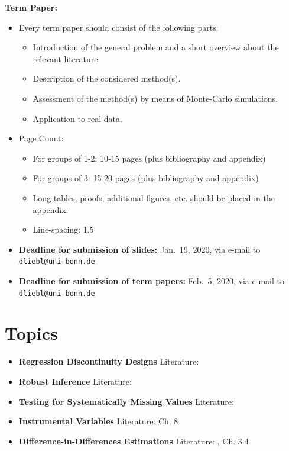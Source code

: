 \documentclass[]{book}
\providecommand{\tightlist}{%
  \setlength{\itemsep}{0pt}\setlength{\parskip}{0pt}}
\theoremstyle{definition}
\theoremstyle{definition}
\theoremstyle{definition}
\theoremstyle{remark}
\begin{document}
\textbf{Term Paper:}

\begin{itemize}
\tightlist
\item
  Every term paper should consist of the following parts:

  \begin{itemize}
  \tightlist
  \item
    Introduction of the general problem and a short overview about the relevant literature.
  \item
    Description of the considered method(s).
  \item
    Assessment of the method(s) by means of Monte-Carlo simulations.
  \item
    Application to real data.
  \end{itemize}
\item
  Page Count:

  \begin{itemize}
  \tightlist
  \item
    For groups of 1-2: 10-15 pages (plus bibliography and appendix)
  \item
    For groups of 3: 15-20 pages (plus bibliography and appendix)
  \item
    Long tables, proofs, additional figures, etc. should be placed in the appendix.
  \item
    Line-spacing: 1.5
  \end{itemize}
\item
  \textbf{Deadline for submission of slides:} Jan.~19, 2020, via e-mail to \href{mailto:dliebl@uni-bonn.de}{\nolinkurl{dliebl@uni-bonn.de}}\\
\item
  \textbf{Deadline for submission of term papers:} Feb.~5, 2020, via e-mail to \href{mailto:dliebl@uni-bonn.de}{\nolinkurl{dliebl@uni-bonn.de}}
\end{itemize}

\hypertarget{topics}{%
\chapter*{Topics}\label{topics}}

\begin{itemize}
\item
  \textbf{Regression Discontinuity Designs}
  Literature: \citet{IL2008}
\item
  \textbf{Robust Inference}
  Literature: \citet{RobInf2011}
\item
  \textbf{Testing for Systematically Missing Values}
  Literature: \citet{L1988}
\item
  \textbf{Instrumental Variables}
  Literature: \citet{DMcK2004} Ch. 8
\item
  \textbf{Difference-in-Differences Estimations}
  Literature: \citet{DID_2004}, \citet{cerulli2015} Ch. 3.4
\end{itemize}
\end{document}
